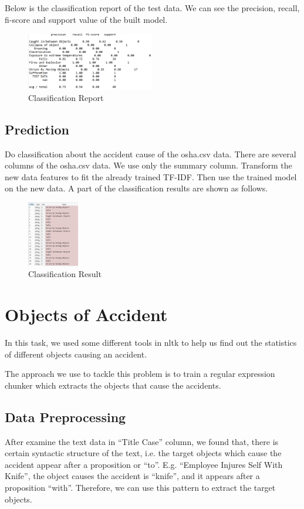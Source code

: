 \documentclass[DIV=calc, paper=a4, fontsize=11pt, twocolumn]{scrartcl}	 %
\begin{document}
Below is the classification report of the test data. We can see the
precision, recall, fi-score and support value of the built model.


\begin{figure}[h!]
  \centering
      \includegraphics[width=0.5\textwidth]{class_report.png}
   \caption{Classification Report}
\end{figure}

\subsection{Prediction}

Do classification about the accident cause of the osha.csv data. There
are several columns of the osha.csv data. We use only the summary
column. Transform the new data features to fit the already trained
TF-IDF. Then use the trained model on the new data. A part of the
classification results are shown as follows.

\begin{figure}[h!]
  \centering
      \includegraphics[width=0.2\textwidth]{class_result.png}
   \caption{Classification Result}
\end{figure}

\section{Objects of Accident}
In this task, we used some different tools in nltk to help us find out
the statistics of different objects causing an accident.


The approach we use to tackle this problem is to train a regular
expression chunker which extracts the objects that cause the
accidents.

\subsection{Data Preprocessing}
After examine the text data in “Title Case” column, we found that,
there is certain syntactic structure of the text, i.e. the target
objects which cause the accident appear after a proposition or
“to”. E.g. “Employee Injures Self With Knife”, the object causes the
accident is “knife”, and it appears after a proposition
“with”. Therefore, we can use this pattern to extract the target
objects.
\end{document}
